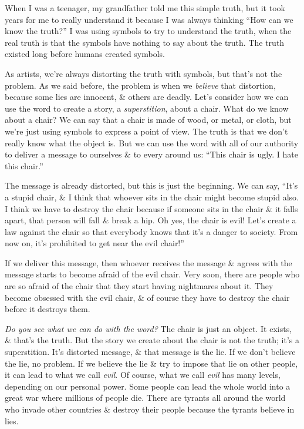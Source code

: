 \documentclass{article}
\numberwithin{equation}{section}
\begin{document}
When I was a teenager, my grandfather told me this simple truth, but it took years for me to really understand it because I was always thinking ``How can we know the truth?'' I was using symbols to try to understand the truth, when the real truth is that the symbols have nothing to say about the truth. The truth existed long before humans created symbols.

As artists, we're always distorting the truth with symbols, but that's not the problem. As we said before, the problem is when we \textit{believe} that distortion, because some lies are innocent, \& others are deadly. Let's consider how we can use the word to create a story, a \textit{superstition}, about a chair. What do we know about a chair? We can say that a chair is made of wood, or metal, or cloth, but we're just using symbols to express a point of view. The truth is that we don't really know what the object is. But we can use the word with all of our authority to deliver a message to ourselves \& to every around us: ``This chair is ugly. I hate this chair.''

The message is already distorted, but this is just the beginning. We can say, ``It's a stupid chair, \& I think that whoever sits in the chair might become stupid also. I think we have to destroy the chair because if someone sits in the chair \& it falls apart, that person will fall \& break a hip. Oh yes, the chair is evil! Let's create a law against the chair so that everybody knows that it's a danger to society. From now on, it's prohibited to get near the evil chair!''

If we deliver this message, then whoever receives the message \& agrees with the message starts to become afraid of the evil chair. Very soon, there are people who are so afraid of the chair that they start having nightmares about it. They become obsessed with the evil chair, \& of course they have to destroy the chair before it destroys them.

\textit{Do you see what we can do with the word?} The chair is just an object. It exists, \& that's the truth. But the story we create about the chair is not the truth; it's a superstition. It's distorted message, \& that message is the lie. If we don't believe the lie, no problem. If we believe the lie \& try to impose that lie on other people, it can lead to what we call \textit{evil}. Of course, what we call \textit{evil} has many levels, depending on our personal power. Some people can lead the whole world into a great war where millions of people die. There are tyrants all around the world who invade other countries \& destroy their people because the tyrants believe in lies.
\end{document}

